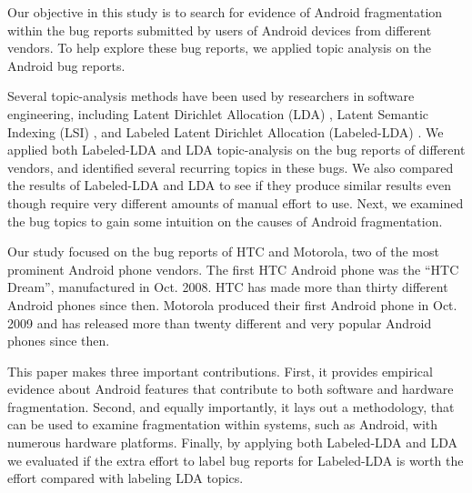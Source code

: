 \documentclass[10pt, conference, compsocconf]{IEEEtran}
\begin{document}
Our objective in this study is to search for evidence of
Android
fragmentation within the bug reports submitted by users of Android devices
from different vendors. To help explore these bug reports, we applied topic analysis on the
Android bug reports. 

Several topic-analysis methods have been used by researchers in
software engineering, including Latent Dirichlet Allocation (LDA) \cite{Asuncion:2010,Linstead:2009}
, Latent Semantic Indexing (LSI) \cite{Marcus04aninformation}
, and Labeled Latent Dirichlet Allocation
(Labeled-LDA) \cite{labeledlda}. We applied both
Labeled-LDA and LDA topic-analysis on the bug reports
of different vendors, and identified several recurring topics in these
bugs. 
We also compared the results of Labeled-LDA and LDA to see if they
produce similar results even though require very different amounts of
manual effort to use.
Next, we examined the bug topics to gain some intuition on the
causes of Android fragmentation.	

Our study focused on the bug reports of HTC and Motorola, two of the
most prominent Android phone vendors. The first HTC Android phone was
the ``HTC Dream'', manufactured in Oct. 2008. HTC has made more than
thirty different Android phones since then. Motorola produced their
first Android phone in Oct. 2009 and has released more than twenty
different and very popular Android phones since then. 
 
This paper makes three important contributions. First, it provides
empirical evidence about Android features that contribute to both software
and hardware fragmentation. Second, and equally importantly, it lays
out a methodology, that can be used to examine fragmentation within
systems, such as Android, with numerous hardware platforms. Finally,
by applying both Labeled-LDA and LDA we evaluated if the extra effort
to label bug reports for Labeled-LDA is worth the effort compared with
labeling LDA topics.
\end{document}

